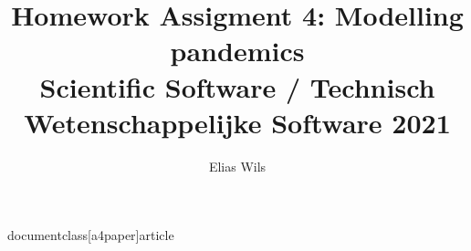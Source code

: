 documentclass[a4paper]{article}

\usepackage{sectsty}
\usepackage{float}
\usepackage{graphicx}
\usepackage{listings}
\usepackage{subcaption}
\usepackage{framed}
\usepackage[]{enumitem}
\sectionfont{\fontsize{12}{15}\selectfont}
\usepackage[left=90.00pt, right=90.00pt, top=100.00pt, bottom=100.00pt]{geometry}
\title{Homework Assigment 4: Modelling pandemics \\ \large Scientific Software / Technisch Wetenschappelijke Software 2021}
\author{Elias Wils}